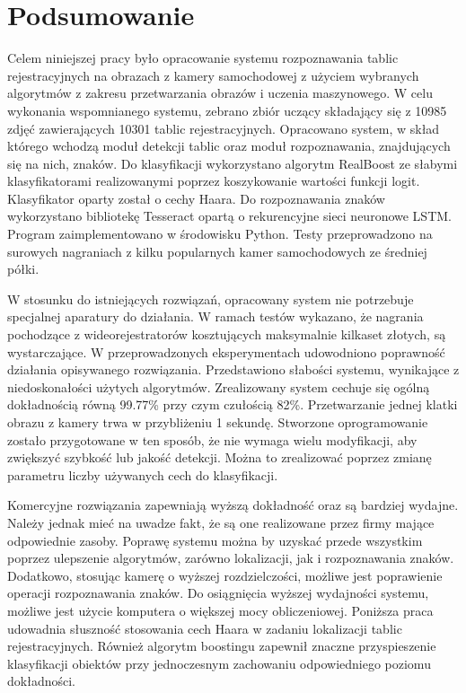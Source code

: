 %


\chapter*{Podsumowanie}
Celem niniejszej pracy było opracowanie systemu rozpoznawania tablic rejestracyjnych na obrazach z kamery samochodowej z użyciem wybranych algorytmów z zakresu przetwarzania obrazów i uczenia maszynowego.
W celu wykonania wspomnianego systemu, zebrano zbiór uczący składający się z 10985 zdjęć zawierających 10301 tablic rejestracyjnych.
Opracowano system, w skład którego wchodzą moduł detekcji tablic oraz moduł rozpoznawania, znajdujących się na nich, znaków.
Do klasyfikacji wykorzystano algorytm RealBoost ze słabymi klasyfikatorami realizowanymi poprzez koszykowanie wartości funkcji logit.
Klasyfikator oparty został o cechy Haara.
Do rozpoznawania znaków wykorzystano bibliotekę Tesseract opartą o rekurencyjne sieci neuronowe LSTM\@.
Program zaimplementowano w środowisku Python.
Testy przeprowadzono na surowych nagraniach z kilku popularnych kamer samochodowych ze średniej półki.

W stosunku do istniejących rozwiązań, opracowany system nie potrzebuje specjalnej aparatury do działania.
W ramach testów wykazano, że nagrania pochodzące z wideorejestratorów kosztujących maksymalnie kilkaset złotych, są wystarczające.
W przeprowadzonych eksperymentach udowodniono poprawność działania opisywanego rozwiązania.
Przedstawiono słabości systemu, wynikające z niedoskonałości użytych algorytmów.
Zrealizowany system cechuje się ogólną dokładnością równą 99.77\% przy czym czułością 82\%.
Przetwarzanie jednej klatki obrazu z kamery trwa w przybliżeniu 1 sekundę.
Stworzone oprogramowanie zostało przygotowane w ten sposób, że nie wymaga wielu modyfikacji, aby zwiększyć szybkość lub jakość detekcji.
Można to zrealizować poprzez zmianę parametru liczby używanych cech do klasyfikacji.

Komercyjne rozwiązania zapewniają wyższą dokładność oraz są bardziej wydajne.
Należy jednak mieć na uwadze fakt, że są one realizowane przez firmy mające odpowiednie zasoby.
Poprawę systemu można by uzyskać przede wszystkim poprzez ulepszenie algorytmów, zarówno lokalizacji, jak i rozpoznawania znaków.
Dodatkowo, stosując kamerę o wyższej rozdzielczości, możliwe jest poprawienie operacji rozpoznawania znaków.
Do osiągnięcia wyższej wydajności systemu, możliwe jest użycie komputera o większej mocy obliczeniowej.
Poniższa praca udowadnia słuszność stosowania cech Haara w zadaniu lokalizacji tablic rejestracyjnych.
Również algorytm boostingu zapewnił znaczne przyspieszenie klasyfikacji obiektów przy jednoczesnym zachowaniu odpowiedniego poziomu dokładności.

